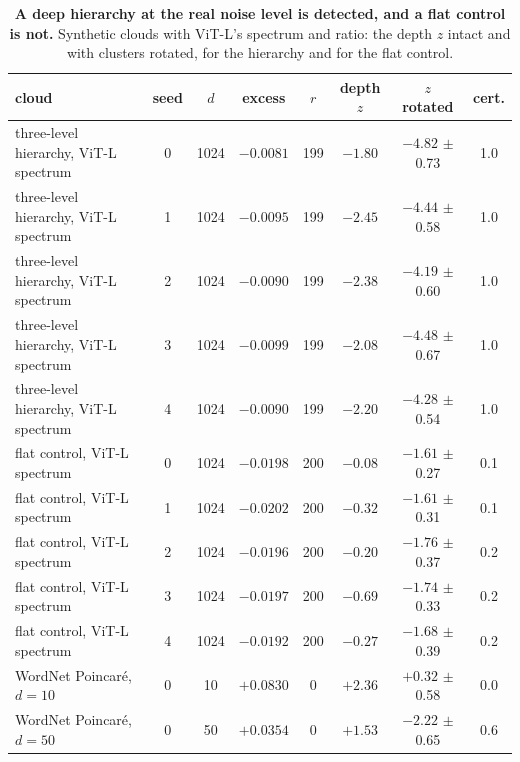 \begin{table}[H]
\centering
\scriptsize
\setlength{\tabcolsep}{2pt}
\begingroup
\footnotesize
\setlength{\tabcolsep}{4pt}
\begin{tabular}{lccccccc}
\toprule
cloud & seed & $d$ & excess & $r$ & depth $z$ & $z$ rotated & cert. \\
\midrule
three-level hierarchy, ViT-L spectrum & 0 & 1024 & $-0.0081$ & 199 & $-1.80$ & $-4.82$ $\pm$ 0.73 & 1.0 \\
three-level hierarchy, ViT-L spectrum & 1 & 1024 & $-0.0095$ & 199 & $-2.45$ & $-4.44$ $\pm$ 0.58 & 1.0 \\
three-level hierarchy, ViT-L spectrum & 2 & 1024 & $-0.0090$ & 199 & $-2.38$ & $-4.19$ $\pm$ 0.60 & 1.0 \\
three-level hierarchy, ViT-L spectrum & 3 & 1024 & $-0.0099$ & 199 & $-2.08$ & $-4.48$ $\pm$ 0.67 & 1.0 \\
three-level hierarchy, ViT-L spectrum & 4 & 1024 & $-0.0090$ & 199 & $-2.20$ & $-4.28$ $\pm$ 0.54 & 1.0 \\
\midrule
flat control, ViT-L spectrum & 0 & 1024 & $-0.0198$ & 200 & $-0.08$ & $-1.61$ $\pm$ 0.27 & 0.1 \\
flat control, ViT-L spectrum & 1 & 1024 & $-0.0202$ & 200 & $-0.32$ & $-1.61$ $\pm$ 0.31 & 0.1 \\
flat control, ViT-L spectrum & 2 & 1024 & $-0.0196$ & 200 & $-0.20$ & $-1.76$ $\pm$ 0.37 & 0.2 \\
flat control, ViT-L spectrum & 3 & 1024 & $-0.0197$ & 200 & $-0.69$ & $-1.74$ $\pm$ 0.33 & 0.2 \\
flat control, ViT-L spectrum & 4 & 1024 & $-0.0192$ & 200 & $-0.27$ & $-1.68$ $\pm$ 0.39 & 0.2 \\
\midrule
WordNet Poincar\'e, $d{=}10$ & 0 & 10 & $+0.0830$ & 0 & $+2.36$ & $+0.32$ $\pm$ 0.58 & 0.0 \\
WordNet Poincar\'e, $d{=}50$ & 0 & 50 & $+0.0354$ & 0 & $+1.53$ & $-2.22$ $\pm$ 0.65 & 0.6 \\
\bottomrule
\end{tabular}
\par\vspace{2pt}
\endgroup
\caption{\textbf{A deep hierarchy at the real noise level is detected, and a flat control is not.} Synthetic clouds with ViT-L's spectrum and ratio: the depth $z$ intact and with clusters rotated, for the hierarchy and for the flat control.
}
\label{tab:q5-power}\label{tab:q5-power-d}
\end{table}
